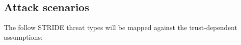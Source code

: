\subsection{Attack scenarios} \label{sec: attack scenarios}
The follow STRIDE threat types\cite{STRIDE} will be mapped against the trust-dependent assumptions:



